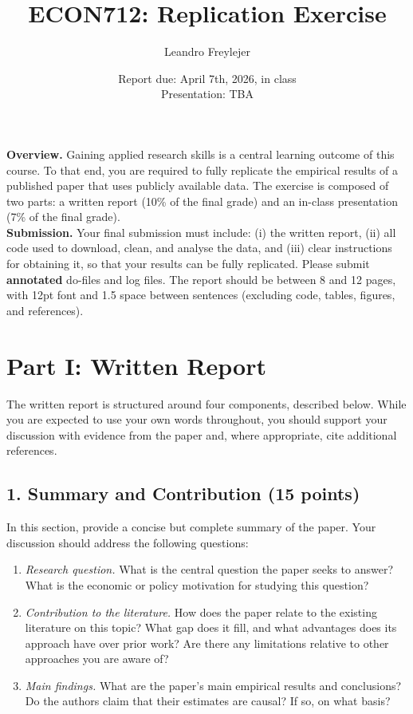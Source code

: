 \documentclass[letterpaper,12pt]{article}
\title{\vspace{-.5in} ECON712: Replication Exercise}
\author{Leandro Freylejer}
\date{Report due: April 7th, 2026, in class \\ Presentation: TBA}
\begin{document}

\maketitle
\vspace{-.3in}

\noindent \textbf{Overview.} Gaining applied research skills is a central learning outcome of this course. To that end, you are required to fully replicate the empirical results of a published paper that uses publicly available data. The exercise is composed of two parts: a written report (10\% of the final grade) and an in-class presentation (7\% of the final grade).\\

\noindent \textbf{Submission.} Your final submission must include: (i) the written report, (ii) all code used to download, clean, and analyse the data, and (iii) clear instructions for obtaining it, so that your results can be fully replicated. Please submit \textbf{annotated} do-files and log files.  The report should be between 8 and 12 pages, with 12pt font and 1.5 space between sentences (excluding code, tables, figures, and references).\\


\section*{Part I: Written Report}

The written report is structured around four components, described below. While you are expected to use your own words throughout, you should support your discussion with evidence from the paper and, where appropriate, cite additional references.

\subsection*{1. \quad Summary and Contribution (15 points)}

In this section, provide a concise but complete summary of the paper. Your discussion should address the following questions:

\begin{enumerate}[label=(\alph*)]
    \item \textit{Research question.} What is the central question the paper seeks to answer? What is the economic or policy motivation for studying this question?

    \item \textit{Contribution to the literature.} How does the paper relate to the existing literature on this topic? What gap does it fill, and what advantages does its approach have over prior work? Are there any limitations relative to other approaches you are aware of?

    \item \textit{Main findings.} What are the paper's main empirical results and conclusions? Do the authors claim that their estimates are causal? If so, on what basis?
\end{enumerate}
\end{document}

